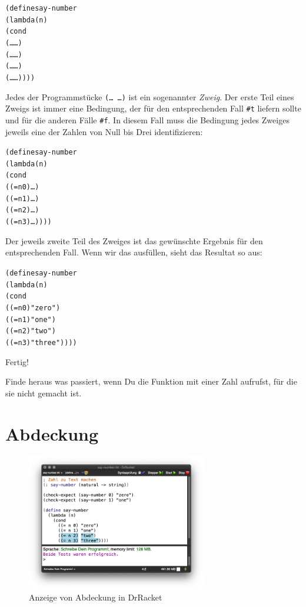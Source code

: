 \begin{alltt}
(define say-number
  (lambda (n)
    (cond
      (\ldots{} \ldots)
      (\ldots{} \ldots)
      (\ldots{} \ldots)
      (\ldots{} \ldots))))
\end{alltt}
%
Jedes der Programmstücke \texttt{(\ldots\ \ldots)} ist ein sogenannter
\textit{Zweig}.  Der erste Teil eines Zweigs ist immer
eine Bedingung, der für den entsprechenden Fall \verb|#t| liefern
sollte und für die anderen Fälle \verb|#f|.  In diesem Fall muss die
Bedingung jedes Zweiges jeweils eine der Zahlen von Null bis Drei
identifizieren:
%
\begin{alltt}
(define say-number
  (lambda (n)
    (cond
      ((= n 0) \ldots)
      ((= n 1) \ldots)
      ((= n 2) \ldots)
      ((= n 3) \ldots))))
\end{alltt}
%
Der jeweils zweite Teil des Zweiges ist das gewünschte Ergebnis für
den entsprechenden Fall.  Wenn wir das ausfüllen, sieht das Resultat
so aus:
%
\begin{alltt}
(define say-number
  (lambda (n)
    (cond
      ((= n 0) "zero")
      ((= n 1) "one")
      ((= n 2) "two")
      ((= n 3) "three"))))
\end{alltt}
%
Fertig!
\begin{aufgabe}
  Finde heraus was passiert, wenn Du die Funktion mit einer Zahl
  aufrufst, für die sie nicht gemacht ist.
\end{aufgabe}

\section{Abdeckung}
\label{sec:testabdeckung}

\begin{figure}[tb]
  \centering
  \includegraphics[width=0.7\textwidth]{i1verzw/coverage}
  \caption{Anzeige von Abdeckung in DrRacket}
  \label{fig:coverage}
\end{figure}

